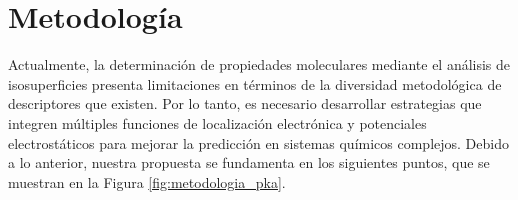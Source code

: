 \documentclass[12pt]{article}
\begin{document}
	
	
	
	
	
	\clearpage
	
	\section{Metodolog\'{i}a}
	
		Actualmente, la determinaci\'{o}n de propiedades moleculares mediante el an\'{a}lisis de isosuperficies presenta limitaciones en t\'{e}rminos de la diversidad metodol\'{o}gica de descriptores que existen. 
	Por lo tanto, es necesario desarrollar estrategias que integren m\'{u}ltiples funciones de localizaci\'{o}n electr\'{o}nica y potenciales electrost\'{a}ticos para mejorar la predicci\'{o}n en sistemas qu\'{i}micos complejos. Debido a lo anterior, nuestra propuesta se fundamenta en los siguientes puntos, que se muestran en la Figura \ref{fig:metodologia_pka}. 
\end{document}
